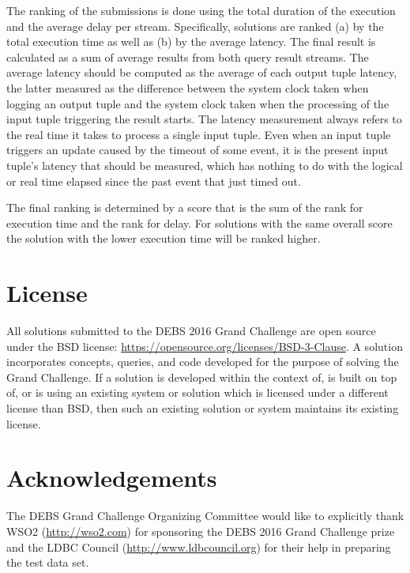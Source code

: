 \documentclass{sig-alternate}
\begin{document}
The ranking of the submissions is done using the total duration of the execution and the average delay per stream. Specifically, solutions are ranked (a) by the total execution time as well as (b) by the average latency. The final result is calculated as a sum of average results from both query result streams. The average latency should be computed as the average of each output tuple latency, the latter measured as the difference between the system clock taken when logging an output tuple and the system clock taken when the processing of the input tuple triggering the result starts. The latency measurement always refers to the real time it takes to process a single input tuple. Even when an input tuple triggers an update caused by the timeout of some event, it is the present input tuple's latency that should be measured, which has nothing to do with the logical or real time elapsed since the past event that just timed out.

The final ranking is determined by a score that is the sum of the rank for execution time and the rank for delay. For solutions with the same overall score the solution with the lower execution time will be ranked higher.

\newpage
\section{License}
All solutions submitted to the DEBS 2016 Grand Challenge are open source under the BSD license: \url{https://opensource.org/licenses/BSD-3-Clause}. A solution incorporates concepts, queries, and code developed for the purpose of solving the Grand Challenge. If a solution is developed within the context of, is built on top of, or is using an existing system or solution which is licensed under a different license than BSD, then such an existing solution or system maintains its existing license.

\section{Acknowledgements}
The DEBS Grand Challenge Organizing Committee would like to explicitly thank WSO2 (\url{http://wso2.com}) for sponsoring the DEBS 2016 Grand Challenge prize and the LDBC Council (\url{http://www.ldbcouncil.org}) for their help in preparing the test data set.




\end{document}
